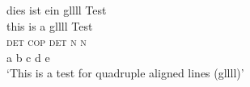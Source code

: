 \ea
 \gllll dies ist ein gllll Test\\
      this is a gllll Test\\
      \textsc{det} \textsc{cop} \textsc{det} \textsc{n} \textsc{n}\\
     a b c d e\\ 
 \glt `This is a test for quadruple aligned lines (gllll)'
\z